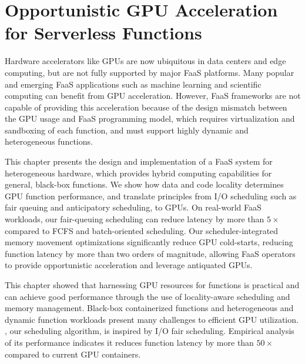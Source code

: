 \chapter{Opportunistic GPU Acceleration for Serverless Functions}




%  
Hardware accelerators like GPUs are now ubiquitous in data centers and edge computing, but are not fully supported by major FaaS platforms.
Many popular and emerging FaaS applications such as machine learning and scientific computing can benefit from GPU acceleration.
However, FaaS frameworks are not capable of providing this acceleration because of the design mismatch between the GPU usage and FaaS programming model, which requires virtualization and sandboxing of each function, and must support highly dynamic and heterogeneous functions. 

This chapter presents the design and implementation of a FaaS system for heterogeneous hardware, which provides hybrid computing capabilities for general, black-box functions.
We show how data and code locality determines GPU function performance, and translate principles from I/O scheduling such as fair queuing and anticipatory scheduling, to GPUs. 
On real-world FaaS workloads, our fair-queuing scheduling can reduce latency by more than $5\times$ compared to FCFS and batch-oriented scheduling. 
Our scheduler-integrated memory movement optimizations significantly reduce GPU cold-starts, reducing function latency by more than two orders of magnitude, allowing FaaS operators to provide opportunistic acceleration and leverage antiquated GPUs. 










%



This chapter showed that harnessing GPU resources for functions is practical and can achieve good performance through the use of locality-aware scheduling and memory management.
Black-box containerized functions and heterogeneous and dynamic function workloads present many challenges to efficient GPU utilization. 
\QName, our scheduling algorithm, is inspired by I/O fair scheduling. Empirical analysis of its performance indicates it reduces function latency by more than $50\times$ compared to current GPU containers. 

% 
